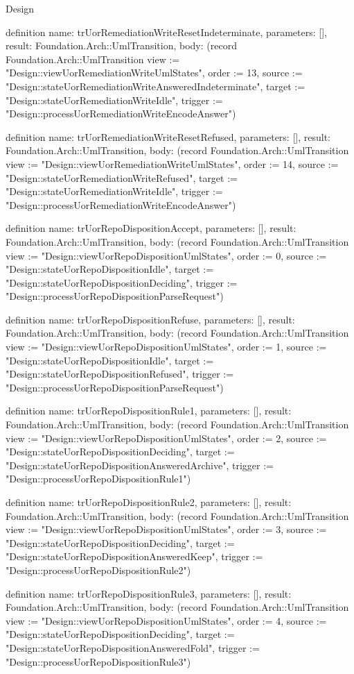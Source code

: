 \begin{lexlean}{Design}
\begin{semanticmodule}
definition{
  name: trUorRemediationWriteResetIndeterminate,
  parameters: [],
  result: Foundation.Arch::UmlTransition,
  body: (record Foundation.Arch::UmlTransition {view := "Design::viewUorRemediationWriteUmlStates", order := 13, source := "Design::stateUorRemediationWriteAnsweredIndeterminate", target := "Design::stateUorRemediationWriteIdle", trigger := "Design::processUorRemediationWriteEncodeAnswer"})
}

definition{
  name: trUorRemediationWriteResetRefused,
  parameters: [],
  result: Foundation.Arch::UmlTransition,
  body: (record Foundation.Arch::UmlTransition {view := "Design::viewUorRemediationWriteUmlStates", order := 14, source := "Design::stateUorRemediationWriteRefused", target := "Design::stateUorRemediationWriteIdle", trigger := "Design::processUorRemediationWriteEncodeAnswer"})
}

definition{
  name: trUorRepoDispositionAccept,
  parameters: [],
  result: Foundation.Arch::UmlTransition,
  body: (record Foundation.Arch::UmlTransition {view := "Design::viewUorRepoDispositionUmlStates", order := 0, source := "Design::stateUorRepoDispositionIdle", target := "Design::stateUorRepoDispositionDeciding", trigger := "Design::processUorRepoDispositionParseRequest"})
}

definition{
  name: trUorRepoDispositionRefuse,
  parameters: [],
  result: Foundation.Arch::UmlTransition,
  body: (record Foundation.Arch::UmlTransition {view := "Design::viewUorRepoDispositionUmlStates", order := 1, source := "Design::stateUorRepoDispositionIdle", target := "Design::stateUorRepoDispositionRefused", trigger := "Design::processUorRepoDispositionParseRequest"})
}

definition{
  name: trUorRepoDispositionRule1,
  parameters: [],
  result: Foundation.Arch::UmlTransition,
  body: (record Foundation.Arch::UmlTransition {view := "Design::viewUorRepoDispositionUmlStates", order := 2, source := "Design::stateUorRepoDispositionDeciding", target := "Design::stateUorRepoDispositionAnsweredArchive", trigger := "Design::processUorRepoDispositionRule1"})
}

definition{
  name: trUorRepoDispositionRule2,
  parameters: [],
  result: Foundation.Arch::UmlTransition,
  body: (record Foundation.Arch::UmlTransition {view := "Design::viewUorRepoDispositionUmlStates", order := 3, source := "Design::stateUorRepoDispositionDeciding", target := "Design::stateUorRepoDispositionAnsweredKeep", trigger := "Design::processUorRepoDispositionRule2"})
}

definition{
  name: trUorRepoDispositionRule3,
  parameters: [],
  result: Foundation.Arch::UmlTransition,
  body: (record Foundation.Arch::UmlTransition {view := "Design::viewUorRepoDispositionUmlStates", order := 4, source := "Design::stateUorRepoDispositionDeciding", target := "Design::stateUorRepoDispositionAnsweredFold", trigger := "Design::processUorRepoDispositionRule3"})
}


\end{semanticmodule}
\end{lexlean}
